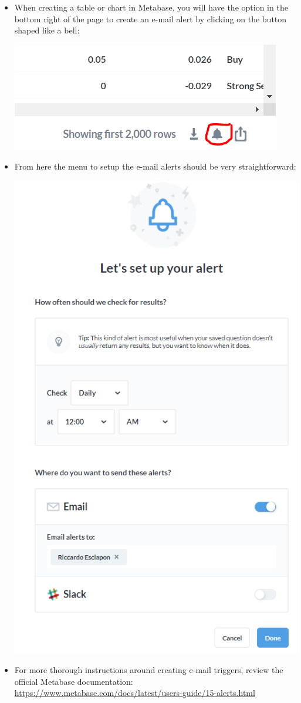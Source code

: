 \documentclass[
]{book}
\begin{document}
\begin{itemize}
\item
  When creating a table or chart in Metabase, you will have the option in the bottom right of the page to create an e-mail alert by clicking on the button shaped like a bell:

  \includegraphics{images/AlertsBell.png}
\item
  From here the menu to setup the e-mail alerts should be very straightforward:

  \includegraphics{images/AlertsSetup.png}
\item
  For more thorough instructions around creating e-mail triggers, review the official Metabase documentation: \url{https://www.metabase.com/docs/latest/users-guide/15-alerts.html}
\end{itemize}
\end{document}
